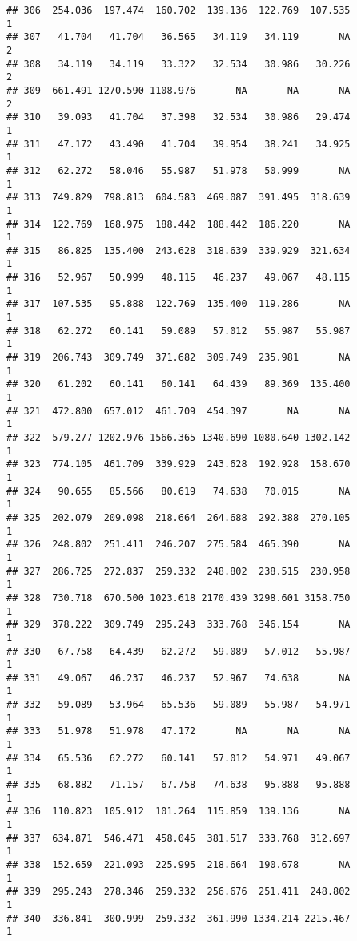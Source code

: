 \documentclass[
]{article}
\begin{document}
\begin{verbatim}
## 306  254.036  197.474  160.702  139.136  122.769  107.535             1
## 307   41.704   41.704   36.565   34.119   34.119       NA             2
## 308   34.119   34.119   33.322   32.534   30.986   30.226             2
## 309  661.491 1270.590 1108.976       NA       NA       NA             2
## 310   39.093   41.704   37.398   32.534   30.986   29.474             1
## 311   47.172   43.490   41.704   39.954   38.241   34.925             1
## 312   62.272   58.046   55.987   51.978   50.999       NA             1
## 313  749.829  798.813  604.583  469.087  391.495  318.639             1
## 314  122.769  168.975  188.442  188.442  186.220       NA             1
## 315   86.825  135.400  243.628  318.639  339.929  321.634             1
## 316   52.967   50.999   48.115   46.237   49.067   48.115             1
## 317  107.535   95.888  122.769  135.400  119.286       NA             1
## 318   62.272   60.141   59.089   57.012   55.987   55.987             1
## 319  206.743  309.749  371.682  309.749  235.981       NA             1
## 320   61.202   60.141   60.141   64.439   89.369  135.400             1
## 321  472.800  657.012  461.709  454.397       NA       NA             1
## 322  579.277 1202.976 1566.365 1340.690 1080.640 1302.142             1
## 323  774.105  461.709  339.929  243.628  192.928  158.670             1
## 324   90.655   85.566   80.619   74.638   70.015       NA             1
## 325  202.079  209.098  218.664  264.688  292.388  270.105             1
## 326  248.802  251.411  246.207  275.584  465.390       NA             1
## 327  286.725  272.837  259.332  248.802  238.515  230.958             1
## 328  730.718  670.500 1023.618 2170.439 3298.601 3158.750             1
## 329  378.222  309.749  295.243  333.768  346.154       NA             1
## 330   67.758   64.439   62.272   59.089   57.012   55.987             1
## 331   49.067   46.237   46.237   52.967   74.638       NA             1
## 332   59.089   53.964   65.536   59.089   55.987   54.971             1
## 333   51.978   51.978   47.172       NA       NA       NA             1
## 334   65.536   62.272   60.141   57.012   54.971   49.067             1
## 335   68.882   71.157   67.758   74.638   95.888   95.888             1
## 336  110.823  105.912  101.264  115.859  139.136       NA             1
## 337  634.871  546.471  458.045  381.517  333.768  312.697             1
## 338  152.659  221.093  225.995  218.664  190.678       NA             1
## 339  295.243  278.346  259.332  256.676  251.411  248.802             1
## 340  336.841  300.999  259.332  361.990 1334.214 2215.467             1

\end{verbatim}
\end{document}
